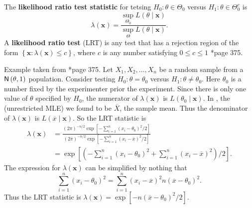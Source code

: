 \begin{defe} \label{defe: lrt}
    The {\bf likelihood ratio test statistic} for tetsing $H_0 : \theta \in \Theta_{0}$ versus $H_1 : \theta \in \Theta_{0}^{c}$ is
    \begin{equation*}
        \lambda (\bm{x}) = \frac{\sup_{\Theta_0} L \left( \theta \mid \bm{x} \right)}{\sup_{\Theta} L \left( \theta \mid \bm{x} \right)}.
    \end{equation*}
    A {\bf likelihood ratio test} (LRT) is any test that has a rejection region of the form $\left\{ \bm{x} : \lambda \left( \bm{x} \right) \leq c \right\}$, where $c$ is any number satisfying $0 \leq c \leq 1$ \cite{CasellaGeorge2001SI}*{page 375}.
\end{defe}

\begin{exam} \label{exam: normal_lrt}
    Example taken from \cite{CasellaGeorge2001SI}*{page 375}. Let $X_1, X_2 , \ldots , X_n$ be a random sample from a ${\sf N} \left( \theta , 1 \right)$ population. Consider testing $H_0 : \theta = \theta_0$ versus $H_1 : \theta \neq \theta_0$. Here $\theta_0$ is a number fixed by the experimenter prior the experiment. Since there is only one value of $\theta$ specified by $H_0$, the numerator of $\lambda \left( \bm{x} \right)$ is $L \left( \theta_0 \mid \bm{x} \right)$. In , the (unrestricted MLE) we found to be $\overline{X}$, the sample mean. Thus the denominator of $\lambda (\bm{x})$ is $L (\overline{x} \mid \bm{x})$. So the LRT statistic is
    \begin{align*}
        \lambda (\bm{x}) & = \frac{(2\pi)^{-n/2} \exp \left[ - \sum_{i=1}^{n} (x_i -\theta_0)^2 /2 \right]}{(2\pi)^{-n/2} \exp \left[ - \sum_{i=1}^{n} (x_i -\overline{x})^2 /2 \right]} \\
                         & = \exp \left[ \left( - \sum_{i=1}^{n} (x_i -\theta_0)^2 +  \sum_{i=1}^{n} (x_i -\overline{x})^2 \right)/2 \right].
    \end{align*}
    The expression for $\lambda (\bm{x})$ can be simplified by nothing that
    \begin{equation*}
        \sum_{i=1}^{n} (x_i -\theta_0)^2 = \sum_{i=1}^{n} (x_i -\overline{x})^2 n (\overline{x} - \theta_{0})^2.
    \end{equation*}
    Thus the LRT statistic is $\lambda (\bm{x}) = \exp \left[ -n \left( \overline{x} - \theta_0 \right)^2 /2 \right]$.
\end{exam}

